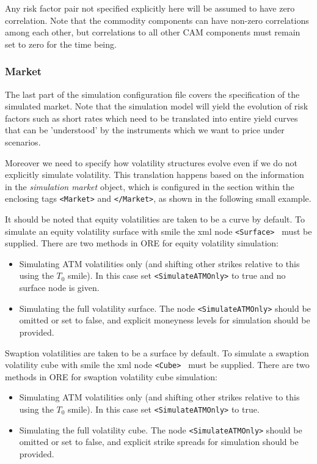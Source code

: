 \documentclass[12pt, a4paper]{article}
\begin{document}
{Any risk factor pair not specified explicitly here will be assumed to have zero correlation. Note that the commodity components can have non-zero correlations among each other, but correlations to all other CAM components must remain set to zero for the time being.

\subsubsection{Market}\label{sec:sim_market}

The last part of the simulation configuration file covers the specification of the simulated market.  Note that the
simulation model will yield the evolution of risk factors such as short rates which need to be translated into entire
yield curves that can be 'understood' by the instruments which we want to price under scenarios.  

Moreover we need to specify how volatility structures evolve even if we do not explicitly simulate volatility. This 
translation happens based on the information in the {\em simulation market} object, which is configured in the section 
within the enclosing tags {\tt <Market>} and {\tt </Market>}, as shown in the following small example.

It should be noted that equity volatilities are taken to be a curve by default. To simulate an equity volatility surface with smile the xml node {\tt <Surface> } must be supplied.
There are two methods in ORE for equity volatility simulation: 
\begin{itemize}
\item Simulating ATM volatilities only (and shifting other strikes relative to this using the $T_{0}$ smile). In this
  case set {\tt <SimulateATMOnly>} to true and no surface node is given.
\item Simulating the full volatility surface. The node {\tt <SimulateATMOnly>} should be omitted or set to false, and
  explicit moneyness levels for simulation should be provided.
\end{itemize}

Swaption volatilities are taken to be a surface by default. To simulate a swaption volatility cube with smile the xml node {\tt <Cube> } must be supplied.
There are two methods in ORE for swaption volatility cube simulation: 
\begin{itemize}
\item Simulating ATM volatilities only (and shifting other strikes relative to this using the $T_{0}$ smile). In this case set {\tt <SimulateATMOnly>} to true.
\item Simulating the full volatility cube. The node {\tt <SimulateATMOnly>} should be omitted or set to false, and
  explicit strike spreads for simulation should be provided.
\end{itemize}

}
\end{document}
